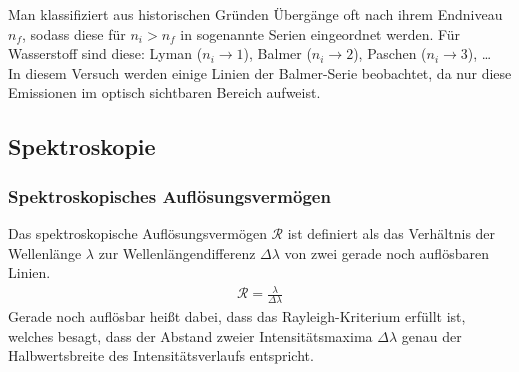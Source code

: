 \documentclass[11pt, a4paper]{article}
\numberwithin{equation}{section}
\begin{document}
Man klassifiziert aus historischen Gründen Übergänge oft nach ihrem Endniveau $n_f$, sodass diese für $n_i > n_f$ in sogenannte Serien eingeordnet werden.
Für Wasserstoff sind diese: Lyman ($n_i \rightarrow 1$), Balmer ($n_i \rightarrow 2$), Paschen ($n_i \rightarrow 3$), \dots\\
In diesem Versuch werden einige Linien der Balmer-Serie beobachtet, da nur diese Emissionen im optisch sichtbaren Bereich aufweist.

\subsection{Spektroskopie}
\subsubsection{Spektroskopisches Auflösungsvermögen}
\label{sssec:aufloesungsvermoegen}
Das spektroskopische Auflösungsvermögen $\mathcal{R}$ ist definiert als das Verhältnis der Wellenlänge $\lambda$ zur Wellenlängendifferenz $\Delta \lambda$ von zwei gerade noch auflösbaren Linien.
\begin{align}
\mathcal{R} = \frac{\lambda}{\Delta \lambda}
\label{eq:aufloesung}
\end{align}
Gerade noch auflösbar heißt dabei, dass das Rayleigh-Kriterium erfüllt ist, welches besagt, dass der Abstand zweier Intensitätsmaxima $\Delta \lambda$ genau der Halbwertsbreite des Intensitätsverlaufs entspricht.
\end{document}
